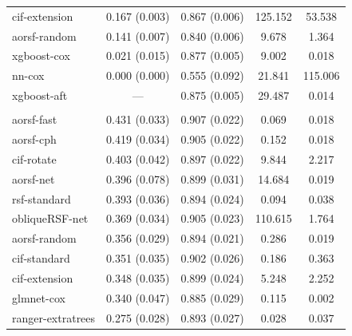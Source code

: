 \documentclass[twoside,11pt]{article}\usepackage[]{graphicx}\usepackage[]{xcolor}
\newenvironment{knitrout}{}{} %
\begin{document}
\begin{knitrout}
\begin{longtable}[t]{lcccc}
\hspace{1em}cif-extension & 0.167 (0.003) & 0.867 (0.006) & 125.152 & 53.538\\
\hspace{1em}aorsf-random & 0.141 (0.007) & 0.840 (0.006) & 9.678 & 1.364\\
\hspace{1em}xgboost-cox & 0.021 (0.015) & 0.877 (0.005) & 9.002 & 0.018\\
\hspace{1em}nn-cox & 0.000 (0.000) & 0.555 (0.092) & 21.841 & 115.006\\
\hspace{1em}xgboost-aft & --- & 0.875 (0.005) & 29.487 & 0.014\\
\addlinespace[0.3em]
\multicolumn{5}{l}{\textit{\textbf{Primary biliary cholangitis; death, n = 276, p = 19}}}\\
\hline
\hspace{1em}aorsf-fast & 0.431 (0.033) & 0.907 (0.022) & 0.069 & 0.018\\
\hspace{1em}aorsf-cph & 0.419 (0.034) & 0.905 (0.022) & 0.152 & 0.018\\
\hspace{1em}cif-rotate & 0.403 (0.042) & 0.897 (0.022) & 9.844 & 2.217\\
\hspace{1em}aorsf-net & 0.396 (0.078) & 0.899 (0.031) & 14.684 & 0.019\\
\hspace{1em}rsf-standard & 0.393 (0.036) & 0.894 (0.024) & 0.094 & 0.038\\
\hspace{1em}obliqueRSF-net & 0.369 (0.034) & 0.905 (0.023) & 110.615 & 1.764\\
\hspace{1em}aorsf-random & 0.356 (0.029) & 0.894 (0.021) & 0.286 & 0.019\\
\hspace{1em}cif-standard & 0.351 (0.035) & 0.902 (0.026) & 0.186 & 0.363\\
\hspace{1em}cif-extension & 0.348 (0.035) & 0.899 (0.024) & 5.248 & 2.252\\
\hspace{1em}glmnet-cox & 0.340 (0.047) & 0.885 (0.029) & 0.115 & 0.002\\
\hspace{1em}ranger-extratrees & 0.275 (0.028) & 0.893 (0.027) & 0.028 & 0.037\\

\end{longtable}
\end{knitrout}
\end{document}
